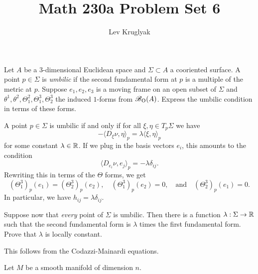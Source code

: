 \documentclass{../../templates/lkx_pset}
\title{Math 230a Problem Set 6}
\author{Lev Kruglyak}
\begin{document}
\maketitle

\begin{problem}{1}
  Let $A$ be a $3$-dimensional Euclidean space and $\Sigma \subset A$ a cooriented surface. A point $p\in \Sigma$ is \emph{umbilic} if the second fundamental form at $p$ is a multiple of the metric at $p$. Suppose $e_1,e_2,e_3$ is a moving frame on an open subset of $\Sigma$ and $\theta^1,\theta^2,\Theta^2_1, \Theta^3_1, \Theta^3_2$ the induced $1$-forms from $\mathscr{B}_{\operatorname{O}}(A)$. Express the umbilic condition in terms of these forms.
\end{problem}

\begin{solution}
  A point $p\in \Sigma$ is umbilic if and only if for all $\xi,\eta\in T_p\Sigma$ we have
  \[
    -\langle D_\xi \nu, \eta \rangle_p = \lambda\langle \xi, \eta \rangle_p
  \]
  for some constant $\lambda\in \mathbb{R}$. If we plug in the basis vectors $e_i$, this amounts to the condition
  \[
    \langle D_{e_i}\nu, e_j\rangle_p = -\lambda\delta_{ij}.
  \]
  Rewriting this in terms of the $\Theta$ forms, we get
  \[
    (\Theta^3_1)_p(e_1) = (\Theta^3_2)_p(e_2),\quad (\Theta^3_1)_p(e_2)=0,\quad\textrm{and}\quad (\Theta^3_2)_p(e_1)=0.
  \]
  In particular, we have $h_{ij}=\lambda \delta_{ij}$.

  \begin{part}{}
    Suppose now that \emph{every} point of $\Sigma$ is umbilic. Then there is a function $\lambda : \Sigma \to \mathbb{R}$ such that the second fundamental form is $\lambda$ times the first fundamental form. Prove that $\lambda$ is locally constant.
  \end{part}

  This follows from the Codazzi-Mainardi equations.
\end{solution}

\begin{problem}{2}
Let $M$ be a smooth manifold of dimension $n$.
\end{problem}
\end{document}
